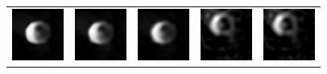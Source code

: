  
 
 
 \begin{figure}[b]
 	\begin{center}
 		
% 		
% 			
% 			
% 			
% 			
% 			
% 			
% 			
 		
 		
 		
 		
 		\begin{tabular}{c c c c c}
 			
 			
 			\includegraphics[width=.19\linewidth]
 			{blackhole_chirp_1_shift.png} & 	\hspace{-.17in} \includegraphics[width=.19\linewidth]
 			{blackhole_celestial_shift.png} & 	\hspace{-.17in}
 			\includegraphics[width=.19\linewidth]
 			{blackhole_blackhole_shift.png}& 	\hspace{-.17in}
 			\includegraphics[width=.19\linewidth]
 			{blackhole_l2.png}& 	\hspace{-.17in} 
 			\includegraphics[width=.19\linewidth]
 			{blackhole_l08_lambda200.png} \\
 			

\end{tabular}
\end{center}
\end{figure}
